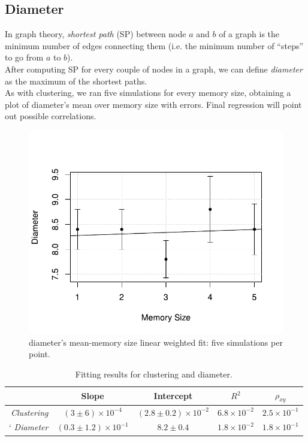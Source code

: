 \subsection{Diameter} \label{diameter}
In graph theory, \textit{shortest path}\cite{diameter} (SP)
between node $a$ and $b$ of a graph is the minimum number of
edges connecting them (i.e. the minimum number of ``steps'' to go
from $a$ to $b$).\\
After computing SP for every couple of nodes in a graph, we can
define \textit{diameter}\cite{diameter} as the maximum of the
shortest paths.\\
As with clustering, we ran five  simulations for every memory
size, obtaining a plot of diameter's mean over memory size with
errors. Final regression will point out possible correlations.
\begin{figure}[h]
  \centering
  \includegraphics[trim={0cm 0cm 0cm 1cm},clip,width=.8\columnwidth]{img/diameter.pdf}
  \caption{diameter's mean-memory size linear weighted fit: five simulations per point.}
  \label{fig:diameter}
\end{figure}
\begin{table}[h]
\label{tab:clusteringdiameter}
\centering
\begin{tabular}{r|cccc}
\toprule
& Slope & Intercept & $R^2$ & $\rho_{xy}$ \\
\midrule
\textit{Clustering} & $(3 \pm 6) \times 10^{-4}$ &$(2.8 \pm 0.2) \times 10^{-2}$ &$6.8 \times 10^{-2}$ & $2.5 \times 10^{-1}$ \\`
\textit{Diameter} & $(0.3 \pm 1.2) \times 10^{-1}$ & $8.2 \pm 0.4$ & $1.8 \times 10^{-2}$ & $1.8 \times 10^{-1}$  \\
\bottomrule
\end{tabular}
\caption{Fitting results for clustering and diameter.}
\end{table}
